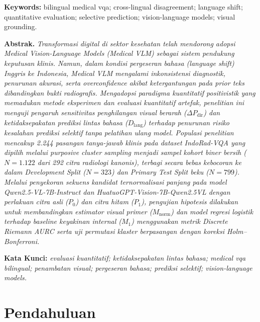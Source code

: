 \documentclass[a4paper,10pt,twoside]{article}
\begin{document}
\vspace{0.5em}
\noindent\textbf{Keywords:} bilingual medical vqa; cross-lingual disagreement; language shift; quantitative evaluation; selective prediction; vision-language models; visual grounding.

\vspace{1em}

\noindent\textbf{Abstrak.} \textit{Transformasi digital di sektor kesehatan telah mendorong adopsi Medical Vision-Language Models (Medical VLM) sebagai sistem pendukung keputusan klinis. Namun, dalam kondisi pergeseran bahasa (language shift) Inggris ke Indonesia, Medical VLM mengalami inkonsistensi diagnostik, penurunan akurasi, serta overconfidence akibat ketergantungan pada prior teks dibandingkan bukti radiografis. Mengadopsi paradigma kuantitatif positivistik yang memadukan metode eksperimen dan evaluasi kuantitatif artefak, penelitian ini menguji pengaruh sensitivitas penghilangan visual berarah ($\Delta P_{\mathrm{dir}}$) dan ketidaksepakatan prediksi lintas bahasa ($D_{\mathrm{lang}}$) terhadap penurunan risiko kesalahan prediksi selektif tanpa pelatihan ulang model. Populasi penelitian mencakup 2.244 pasangan tanya-jawab klinis pada dataset IndoRad-VQA yang dipilih melalui purposive cluster sampling menjadi sampel kohort biner bersih ($N = 1.122$ dari 292 citra radiologi kanonis), terbagi secara bebas kebocoran ke dalam Development Split ($N = 323$) dan Primary Test Split beku ($N = 799$). Melalui penyekoran sekuens kandidat ternormalisasi panjang pada model Qwen2.5-VL-7B-Instruct dan HuatuoGPT-Vision-7B-Qwen2.5VL dengan perlakuan citra asli ($P_0$) dan citra hitam ($P_1$), pengujian hipotesis dilakukan untuk membandingkan estimator visual primer ($M_{\mathrm{norm}}$) dan model regresi logistik terhadap baseline keyakinan internal ($M_1$) menggunakan metrik Discrete Riemann AURC serta uji permutasi klaster berpasangan dengan koreksi Holm--Bonferroni.}

\vspace{0.5em}
\noindent\textbf{Kata Kunci:} \textit{evaluasi kuantitatif; ketidaksepakatan lintas bahasa; medical vqa bilingual; penambatan visual; pergeseran bahasa; prediksi selektif; vision-language models.}

\vspace{1.5em}

\section{Pendahuluan}
\end{document}
